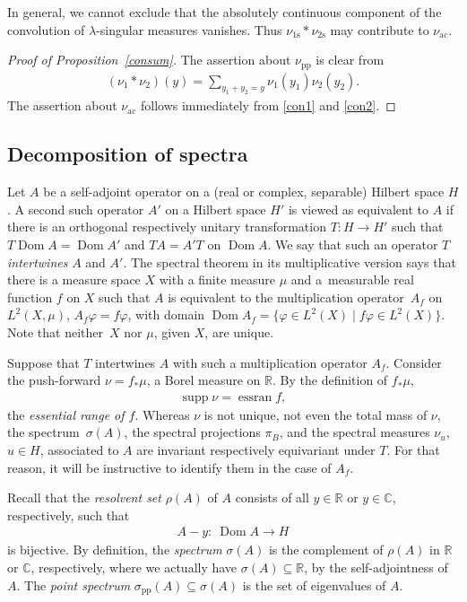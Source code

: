 \documentclass[10pt,a4paper]{amsart}
\numberwithin{equation}{section}
\DeclareMathOperator{\dom}{Dom}
\DeclareMathOperator{\essran}{essran}
\DeclareMathOperator{\supp}{supp}
\def\p{\mathrm{pp}}
\def\ac{\mathrm{ac}}
\def\s{\mathrm s}
\def\C{\mathbb C}
\def\R{\mathbb R}
\def\vf{\varphi}
\begin{document}
In general,
we cannot exclude that the absolutely continuous component of the convolution of $\lambda$-singular measures vanishes.
Thus $\nu_{1\s}*\nu_{2\s}$ may contribute to $\nu_{\ac}$.

\begin{proof}[Proof of Proposition~\ref{consum}]
The assertion about $\nu_{\p}$ is clear from
\begin{align*}
	(\nu_1*\nu_2)(y) = \sum_{y_1+y_2=y}\nu_1(y_1)\nu_2(y_2).
\end{align*}
The assertion about $\nu_{\ac}$ follows immediately from \eqref{con1} and \eqref{con2}.
\end{proof}

\subsection{Decomposition of spectra}%
Let $A$ be a self-adjoint operator on a (real or complex, separable) Hilbert space $H$.
A second such operator $A'$ on a Hilbert space $H'$ is viewed as equivalent to $A$
if there is an orthogonal respectively unitary transformation $T\colon H\to H'$
such that $T\dom A=\dom A'$ and $TA=A'T$ on $\dom A$.
We say that such an operator $T$ \emph{intertwines} $A$ and $A'$.
The spectral theorem in its multiplicative version says that there is a measure space $X$
with a finite measure $\mu$ and a~measurable real function $f$ on $X$
such that $A$ is equivalent to the multiplication operator~$A_f$ on $L^2(X,\mu)$, $A_f\vf=f\vf$,
with domain $\dom A_f=\{\vf\in L^2(X)\mid f\vf\in L^2(X)\}$.
Note that neither~$X$ nor $\mu$, given $X$, are unique.

Suppose that $T$ intertwines $A$ with such a multiplication operator $A_f$.
Consider the push-forward $\nu=f_*\mu$, a Borel measure on $\mathbb{R}$.
By the definition of $f_*\mu$,
\begin{align*}%
	\supp\nu = \essran f,
\end{align*}
the \emph{essential range of $f$}.
Whereas $\nu$ is not unique, not even the total mass of $\nu$,
the spectrum~$\sigma (A)$, the spectral projections $\pi_B$, and the spectral measures $\nu_u$, $u\in H$,
associated to $A$ are invariant respectively equivariant under $T$.
For that reason, it will be instructive to identify them in the case of $A_f$.

Recall that the \emph{resolvent set} $\rho(A)$ of $A$ consists of all $y\in\R$ or $y \in \C$, respectively, such that
\begin{align*}
	A-y \colon \ \dom A \to H
\end{align*}
is bijective.
By definition, the \emph{spectrum} $\sigma(A)$ is the complement of $\rho(A)$ in $\R$ or $\C$, respectively,
where we actually have $\sigma(A)\subseteq\R$, by the self-adjointness of $A$.
The \emph{point spectrum} ${\sigma_{\p}(A)\subseteq\sigma(A)}$ is the set of eigenvalues of $A$.
\end{document}
